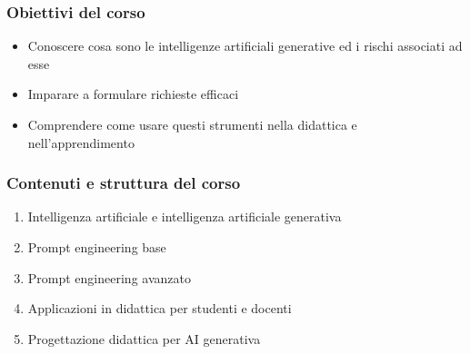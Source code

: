 

\begin{contentframe}
    \frametitle{Obiettivi del corso}

    \begin{itemize}
        \item Conoscere cosa sono le intelligenze artificiali generative ed i rischi associati ad esse
        
        \bigskip
        \item Imparare a formulare richieste efficaci

        \bigskip
        \item Comprendere come usare questi strumenti nella didattica e nell'apprendimento
    \end{itemize}
\end{contentframe}

\begin{contentframe}
    \frametitle{Contenuti e struttura del corso}

    \begin{enumerate}
        \item Intelligenza artificiale e intelligenza artificiale generativa
        \item Prompt engineering base
        \item Prompt engineering avanzato
        \item Applicazioni in didattica per studenti e docenti
        \item Progettazione didattica per AI generativa
    \end{enumerate}
\end{contentframe}



